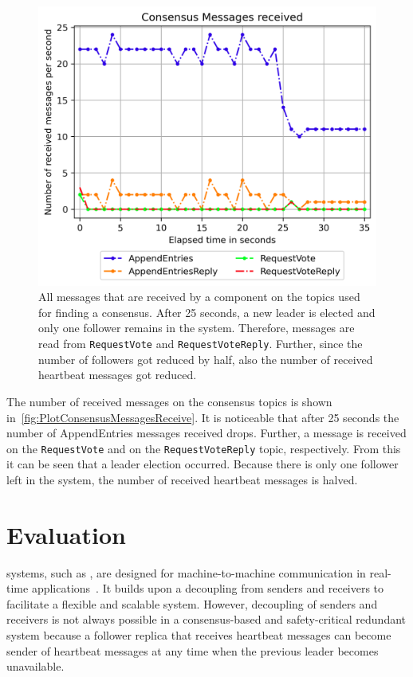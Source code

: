 \begin{figure}[!hb]
	\centering
	\includegraphics[width=0.75\linewidth]{images/plots/ConsensusMessagesReceive}
	\caption{All messages that are received by a component on the topics used for finding a consensus. After 25 seconds, a new leader is elected and only one follower remains in the system. Therefore, messages are read from \texttt{RequestVote} and \texttt{RequestVoteReply}. Further, since the number of followers got reduced by half, also the number of received heartbeat messages got reduced.}
	\label{fig:PlotConsensusMessagesReceive}
\end{figure}

The number of received messages on the consensus topics is shown in~\autoref{fig:PlotConsensusMessagesReceive}.
It is noticeable that after 25 seconds the number of AppendEntries messages received drops.
Further, a message is received on the \texttt{RequestVote} and on the \texttt{RequestVoteReply} topic, respectively.
From this it can be seen that a leader election occurred.
Because there is only one follower left in the system, the number of received heartbeat messages is halved.

\section{ Evaluation}
 systems, such as , are designed for machine-to-machine communication in real-time applications~\cite{omgDDSspec}.
It builds upon a decoupling from senders and receivers to facilitate a flexible and scalable system.
However, decoupling of senders and receivers is not always possible in a consensus-based and safety-critical redundant system because a follower replica that receives heartbeat messages can become sender of heartbeat messages at any time when the previous leader becomes unavailable.

